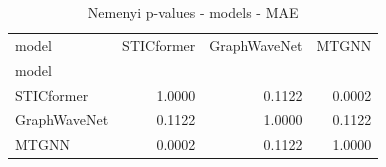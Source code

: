 \begin{table}
\caption{Nemenyi p-values - models - MAE}
\label{tab:nemenyi_models_mae}
\begin{tabular}{lrrr}
\toprule
model & STICformer & GraphWaveNet & MTGNN \\
model &  &  &  \\
\midrule
STICformer & 1.0000 & 0.1122 & 0.0002 \\
GraphWaveNet & 0.1122 & 1.0000 & 0.1122 \\
MTGNN & 0.0002 & 0.1122 & 1.0000 \\
\bottomrule
\end{tabular}
\end{table}
